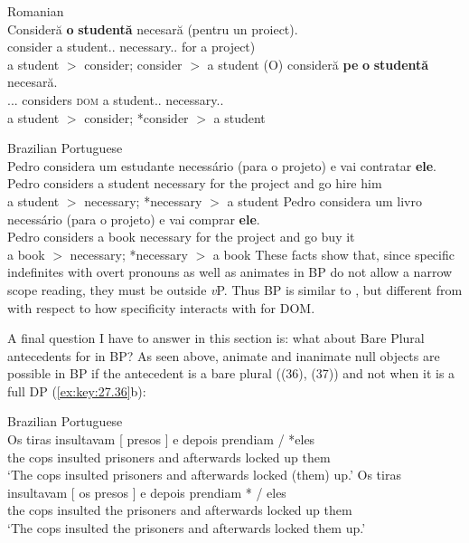 \documentclass[output=paper]{langsci/langscibook}
\begin{document}
\ea\label{ex:key:27.34} Romanian\\
    \ea
        \gll Consideră \textbf{o}    \textbf{studentă} necesară       (pentru un proiect).\\
        consider     a   student.\glossF.\Sg{} necessary.\glossF.\Sg{}   \hphantom{(}for a project)\\
        \glt a student $>$ consider; consider $>$ a student
    \ex
        \gll (O)      consideră \textbf{pe} \textbf{o} \textbf{studentă} necesară.\\
        \hphantom{(}\Cl.\Tsg.\glossF.\Acc{} considers  \textsc{dom}  a student.\glossF.\Sg{}        necessary.\glossF.\Sg{}\\
        \glt a student $>$ consider; *consider $>$ a student
    \z
\z

\ea\label{ex:key:27.35} Brazilian Portuguese\\
    \ea
        \gll Pedro considera um estudante necessário (para o projeto) e     vai contratar \textbf{ele}.\\
              Pedro considers a    student      necessary     \hphantom{(}for   the project and go   hire         him\\
        \glt a student $>$ necessary; *necessary $>$ a student
    \ex
        \gll Pedro  considera um   livro   necessário   (para o projeto) e vai   comprar \textbf{ele}.\\
            Pedro   considers a       book   necessary   \hphantom{(}for   the   project and go     buy         it\\
        \glt a book $>$ necessary; *necessary $>$ a book
    \z
\z
These facts show that, since specific indefinites with overt pronouns as well
as animates in \gls{BP} do not allow a narrow scope reading, they must be outside
\emph{v}P. Thus \gls{BP} is similar to , but different from  with
respect to how specificity interacts with  for DOM\@.

A final question I have to answer in this section is: what about Bare Plural
antecedents for  in BP\@? As seen above, animate and
inanimate null objects are possible in \gls{BP} if the
antecedent is a bare plural ((36), (37)) and not when it is a full DP
(\ref{ex:key:27.36}b):

\ea\label{ex:key:27.36} Brazilian Portuguese\\
    \ea
        \gll Os   tiras    insultavam [ presos ] e depois prendiam \underline{\hphantom{eles}} / *eles\\
          the   cops   insulted {} prisoners {} and   afterwards {locked up} {} {} \hphantom{*}them\\
        \glt  `The cops insulted prisoners and afterwards locked (them) up.'
    \ex
        \gll Os   tiras   insultavam   [ os presos ] e depois prendiam *\underline{\hphantom{eles}} / eles\\
           the  cops  insulted {} the prisoners {} and afterwards {locked up} {} {} them\\
        \glt `The cops insulted the prisoners and afterwards locked them up.'
    \z
\z
\end{document}
